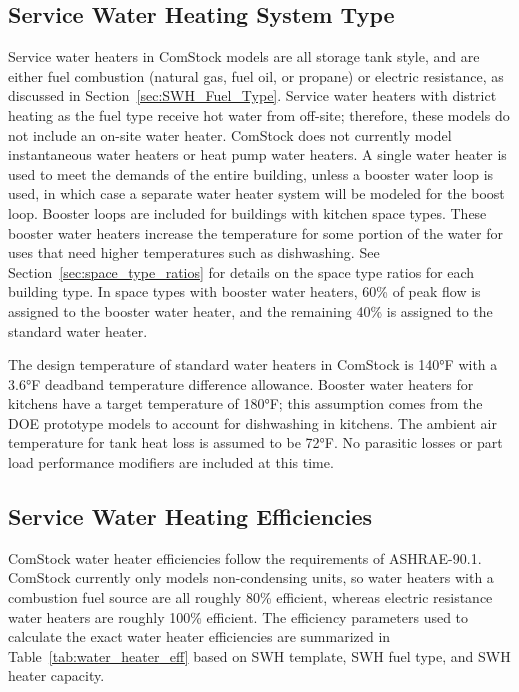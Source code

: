 \subsection{Service Water Heating System Type}

Service water heaters in ComStock models are all storage tank style, and are either fuel combustion (natural gas, fuel oil, or propane) or electric resistance, as discussed in  Section~\ref{sec:SWH_Fuel_Type}. Service water heaters with district heating as the fuel type receive hot water from off-site; therefore, these models do not include an on-site water heater. ComStock does not currently model instantaneous water heaters or heat pump water heaters. A single water heater is used to meet the demands of the entire building, unless a booster water loop is used, in which case a separate water heater system will be modeled for the boost loop. Booster loops are included for buildings with kitchen space types. These booster water heaters increase the temperature for some portion of the water for uses that need higher temperatures such as dishwashing. See Section~\ref{sec:space_type_ratios} for details on the space type ratios for each building type. In space types with booster water heaters, 60\% of peak flow is assigned to the booster water heater, and the remaining 40\% is assigned to the standard water heater.

The design temperature of standard water heaters in ComStock is 140°F with a 3.6°F deadband temperature difference allowance. Booster water heaters for kitchens have a target temperature of 180°F; this assumption comes from the DOE prototype models to account for dishwashing in kitchens. The ambient air temperature for tank heat loss is assumed to be 72°F. No parasitic losses or part load performance modifiers are included at this time.


\subsection{Service Water Heating Efficiencies}

ComStock water heater efficiencies follow the requirements of ASHRAE-90.1. ComStock currently only models non-condensing units, so water heaters with a combustion fuel source are all roughly 80\% efficient, whereas electric resistance water heaters are roughly 100\% efficient. The efficiency parameters used to calculate the exact water heater efficiencies are summarized in Table~\ref{tab:water_heater_eff} based on SWH template, SWH fuel type, and SWH heater capacity. 


